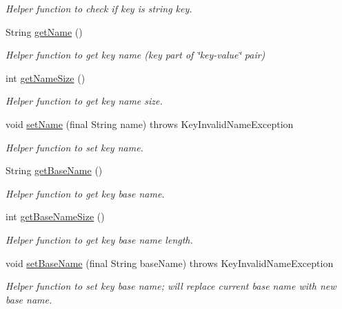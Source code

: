 \begin{DoxyCompactItemize}
\begin{DoxyCompactList}\small\item\em Helper function to check if key is string key. \end{DoxyCompactList}\item 
String \hyperlink{classorg_1_1libelektra_1_1Key_a668626c8403940015ff5031cfa5e973c}{get\+Name} ()
\begin{DoxyCompactList}\small\item\em Helper function to get key name (key part of \char`\"{}key-\/value\char`\"{} pair) \end{DoxyCompactList}\item 
int \hyperlink{classorg_1_1libelektra_1_1Key_aa6477bb5eb12f739858f285650816cc6}{get\+Name\+Size} ()
\begin{DoxyCompactList}\small\item\em Helper function to get key name size. \end{DoxyCompactList}\item 
void \hyperlink{classorg_1_1libelektra_1_1Key_abd5602765701a10b6a10887c09810cf5}{set\+Name} (final String name)  throws Key\+Invalid\+Name\+Exception 	
\begin{DoxyCompactList}\small\item\em Helper function to set key name. \end{DoxyCompactList}\item 
String \hyperlink{classorg_1_1libelektra_1_1Key_a32c556682f808bbc0a4b676879f6b86f}{get\+Base\+Name} ()
\begin{DoxyCompactList}\small\item\em Helper function to get key base name. \end{DoxyCompactList}\item 
int \hyperlink{classorg_1_1libelektra_1_1Key_a24bd83bcae08b956150d8ae3dafe738e}{get\+Base\+Name\+Size} ()
\begin{DoxyCompactList}\small\item\em Helper function to get key base name length. \end{DoxyCompactList}\item 
void \hyperlink{classorg_1_1libelektra_1_1Key_a5226472bedc6a02dee826ee3facdb25f}{set\+Base\+Name} (final String base\+Name)  throws Key\+Invalid\+Name\+Exception 	
\begin{DoxyCompactList}\small\item\em Helper function to set key base name; will replace current base name with new base name. \end{DoxyCompactList}\item 

\end{DoxyCompactItemize}
